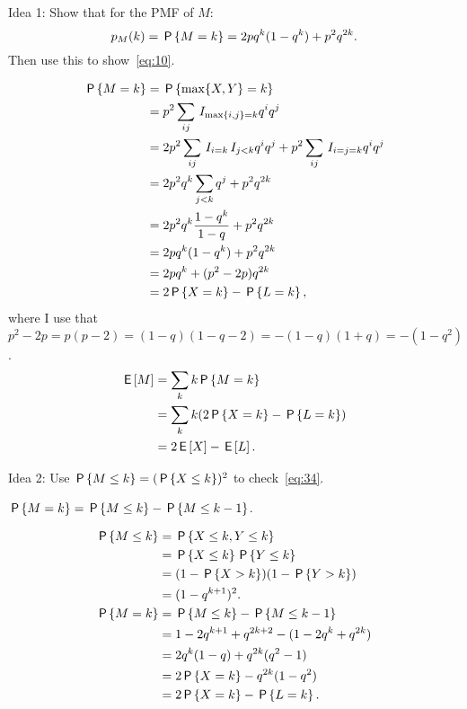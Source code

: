 \documentclass[a4paper,11pt]{article}
\begin{document}
\begin{exercise}\label{ex:1}
Idea 1: Show that for the PMF of $M$: 
\begin{equation}
  \label{eq:34}
p_M(k) = \P{M=k} = 2 pq^{k}(1-q^{k}) + p^2q^{2k}.
\end{equation}
Then use this to show~\cref{eq:10}.
\begin{solution}
  \begin{align}
    \label{eq:14}
\P{M=k}     
&= \P{\max{X, Y} = k} \\
&=p^{2}\sum_{ij}\1{\max{i,j} =k} q^i q^j\\
&=2 p^{2}\sum_{ij}\1{i=k}\1{j < k} q^i q^j + p^{2}\sum_{ij}\1{i=j=k} q^{i} q^j \\
&=2 p^{2}q^{k}\sum_{j < k} q^j + p^{2}q^{2k}\\
&=2 p^{2}q^{k}\frac{1-q^{k}}{1-q} +  p^{2}q^{2k}\\
&=2 pq^{k}(1-q^{k}) + p^{2}q^{2k}\\
&=2 pq^{k} +(p^{2}-2p) q^{2k} \label{eq:18}\\
&=2 \P{X=k} - \P{L=k},
  \end{align}
where I use that $p^{2}-2p = p(p-2) = (1-q)(1-q-2)=-(1-q)(1+q)=-(1-q^{2})$.
  \begin{align}
    \label{eq:15}
\E M 
&= \sum_k k \P{M=k}     \\
&=  \sum_{k}k (2\P{X=k} - \P{L=k}) \\
&= 2 \E X  - \E L.
  \end{align}
\end{solution}
\end{exercise}

\begin{exercise}
Idea 2: Use  $\P{M\leq k} = (\P{X\leq k})^{2}$  to check~\cref{eq:34}.
\begin{hint}
$\P{M=k} = \P{M\leq k} - \P{M\leq k-1}$.
\end{hint}
\begin{solution}
  \begin{align}
    \label{eq:16}
\P{M\leq k}   
&= \P{X\leq k, Y\leq k} \\
&= \P{X\leq k}\P{Y\leq k} \\
&= (1-\P{X> k})(1-\P{Y> k}) \\
&= (1-q^{k+1})^{2}.\\
\P{M=k} &= \P{M\leq k} - \P{M\leq k-1}\\
&= 1-2 q^{k+1} + q^{2k+2} - (1 - 2q^{k} + q^{2k})\\
&= 2 q^{k}(1-q) + q^{2k}(q^{2}-1) \\
&= 2 \P{X=k}  - q^{2k}(1-q^{2}) \\
&= 2 \P{X=k}  - \P{L=k}.
  \end{align}
\end{solution}
\end{exercise}
\end{document}
